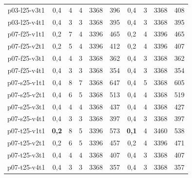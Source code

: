 \begin{table}[h!tbp]
\begin {tabular}[t]{|c|c|c|c|c|c|c|c|c|c|}
p03-l25-v3t1 &	0,4	&	4 &	4	&	3368	&	396	&	0,4	&	3	&	3368	&	408	\\
p03-l25-v4t1 &	0,4	&	3 &	3	&	3368	&	395	&	0,4	&	3	&	3368	&	395	\\
p07-f25-v1t1 &	0,2	&	7 &	4	&	3396	&	465	&	0,2	&	4	&	3396	&	465	\\
p07-f25-v2t1 &	0,2	&	5 &	4	&	3396	&	412	&	0,2	&	4	&	3396	&	407	\\
p07-f25-v3t1 &	0,4	&	4 &	3	&	3368	&	362	&	0,4	&	3	&	3368	&	362	\\
p07-f25-v4t1 &	0,4	&	3 &	3	&	3368	&	354	&	0,4	&	3	&	3368	&	354	\\
p07-s25-v1t1 &	0,4	&	8 &	7	&	3368	&	647	&	0,4	&	5	&	3368	&	605	\\
p07-s25-v2t1 &	0,4	&	6 &	5	&	3368	&	513	&	0,4	&	4	&	3368	&	519	\\
p07-s25-v3t1 &	0,4	&	4 &	4	&	3368	&	437	&	0,4	&	4	&	3368	&	427	\\
p07-s25-v4t1 &	0,4	&	3 &	3	&	3368	&	397	&	0,4	&	3	&	3368	&	397	\\
p07-t25-v1t1 &  {\bf 0,2} &     8 &	5	&	3396	&	573	&  {\bf 0,1}	&	4	&	3460	&	538	\\
p07-t25-v2t1 &	0,2	&	6 &	5	&	3396	&	457	&	0,2	&	4	&	3396	&	471	\\
p07-t25-v3t1 &	0,4	&	4 &	4	&	3368	&	407	&	0,4	&	3	&	3368	&	407	\\
p07-t25-v4t1 &	0,4	&	3 &	3	&	3368	&	357	&	0,4	&	3	&	3368	&	357	\\
\hline
\end{tabular}
\end{table} 
